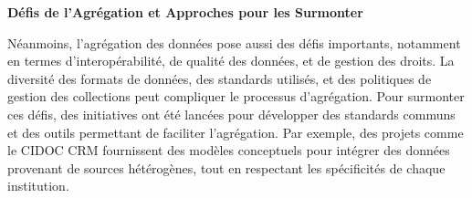 \textbf{Défis de l'Agrégation et Approches pour les Surmonter}\newline

Néanmoins, l'agrégation des données pose aussi des défis importants, notamment en termes d'interopérabilité, de qualité des données, et de gestion des droits. La diversité des formats de données, des standards utilisés, et des politiques de gestion des collections peut compliquer le processus d'agrégation.
Pour surmonter ces défis, des initiatives ont été lancées pour développer des standards communs et des outils permettant de faciliter l'agrégation. Par exemple, des projets comme le CIDOC CRM fournissent des modèles conceptuels pour intégrer des données provenant de sources hétérogènes, tout en respectant les spécificités de chaque institution. \newline

